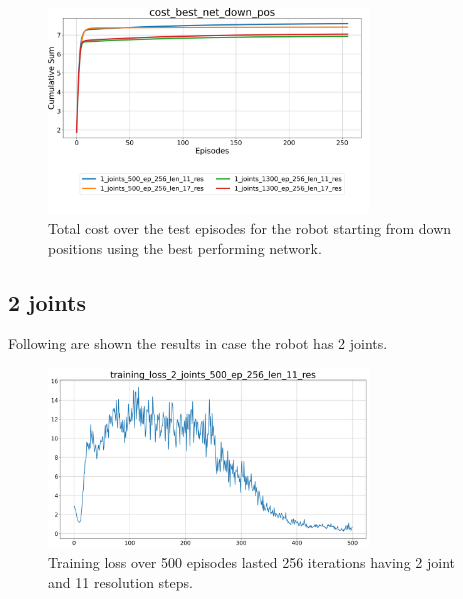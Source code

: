 \documentclass[twocolumn, a4paper]{article}
\begin{document}
\begin{figure}[H]
	\centering
	\includegraphics[width=8.5cm]{"../Figures/Summary_cost_best_net_down_pos_1J.png"}
	\caption{Total cost over the test episodes for the robot starting from
			 down positions using the best performing network.}
	\label{fig:Test_1_best_net_down_pos}
\end{figure}

\subsection{2 joints}
Following are shown the results in case the robot has 2 joints.

\begin{figure}[H]
	\centering
	\includegraphics[width=8.5cm]{"../Figures/training_loss_2J_500E_256EL_11RES.png"}
	\caption{Training loss over 500 episodes lasted 256 iterations having 2
			 joint and 11 resolution steps.}
	\label{fig:TrainLoss_2_500_11}
\end{figure}
\end{document}
